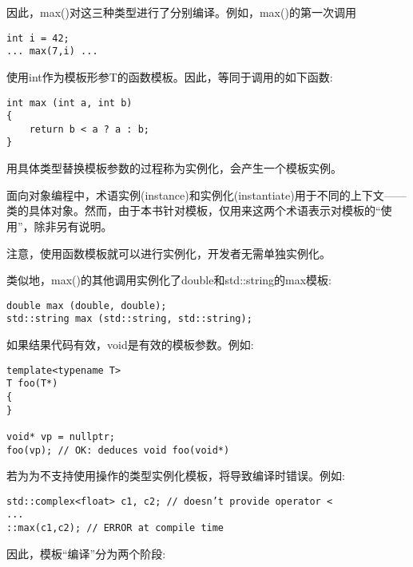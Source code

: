 因此，max()对这三种类型进行了分别编译。例如，max()的第一次调用

\begin{lstlisting}[style=styleCXX]
int i = 42;
... max(7,i) ...
\end{lstlisting}

使用int作为模板形参T的函数模板。因此，等同于调用的如下函数:

\begin{lstlisting}[style=styleCXX]
int max (int a, int b)
{
	return b < a ? a : b;
}
\end{lstlisting}

用具体类型替换模板参数的过程称为实例化，会产生一个模板实例。

\begin{tcolorbox}[colback=webgreen!5!white,colframe=webgreen!75!black]
\hspace*{0.75cm}面向对象编程中，术语实例(instance)和实例化(instantiate)用于不同的上下文——类的具体对象。然而，由于本书针对模板，仅用来这两个术语表示对模板的“使用”，除非另有说明。
\end{tcolorbox}

注意，使用函数模板就可以进行实例化，开发者无需单独实例化。

类似地，max()的其他调用实例化了double和std::string的max模板:

\begin{lstlisting}[style=styleCXX]
double max (double, double);
std::string max (std::string, std::string);
\end{lstlisting}

如果结果代码有效，void是有效的模板参数。例如:

\begin{lstlisting}[style=styleCXX]
template<typename T>
T foo(T*)
{
}

void* vp = nullptr;
foo(vp); // OK: deduces void foo(void*)
\end{lstlisting}


若为为不支持使用操作的类型实例化模板，将导致编译时错误。例如:

\begin{lstlisting}[style=styleCXX]
std::complex<float> c1, c2; // doesn’t provide operator <
...
::max(c1,c2); // ERROR at compile time
\end{lstlisting}

因此，模板“编译”分为两个阶段:

